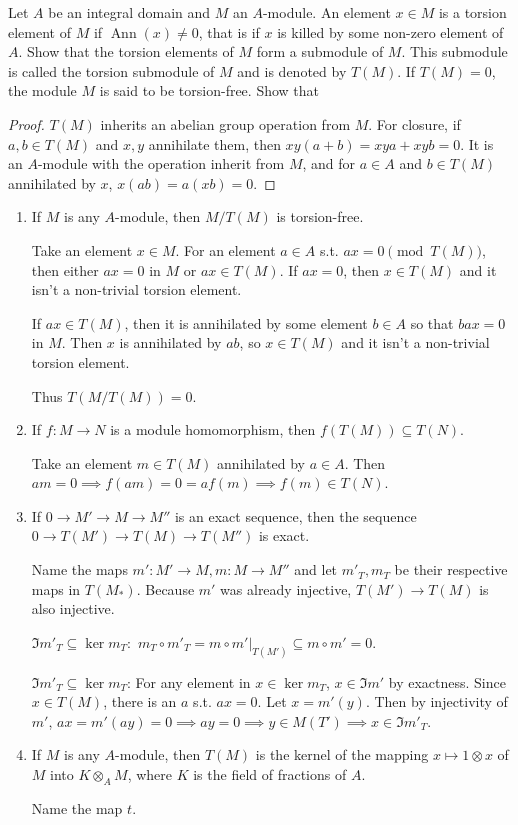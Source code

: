 \begin{questions}
\question Let $A$ be an integral domain and $M$ an $A$-module. An element $x \in M$ is a torsion element of $M$ if $\operatorname{Ann} (x) \ne 0$, that is if $x$ is killed by some non-zero element of $A$. Show that the torsion elements of $M$ form a submodule of $M$. This submodule is called the torsion submodule of $M$ and is denoted by $T(M)$. If $T(M) = 0$, the module $M$ is said to be torsion-free. Show that 
\begin{proof}
	$T(M) $ inherits an abelian group operation from $M $.
	For closure, if $a,b \in T(M) $ and $x,y $ annihilate them, then $xy(a+b) = xya + xyb = 0$.
	It is an $A $-module with the operation inherit from $M $, and for $a\in A $ and $b \in T(M) $ annihilated by $x $, $x(ab) = a(xb) = 0$.
\end{proof}
\begin{enumerate}
	\item If $M $ is any $A $-module, then $M / T(M) $ is torsion-free.
	\begin{solution}
		Take an element $x \in M $.
		For an element $a \in A$ s.t. $ax = 0\pmod {T(M)} $, then either $ax = 0 $ in $M $ or $ax \in T(M) $.
		If $ax = 0 $, then $x \in T(M) $ and it isn't a non-trivial torsion element.

		If $ax\in T(M) $, then it is annihilated by some element $b\in A $ so that $bax = 0 $ in $M $.
		Then $x $ is annihilated by $ab $, so $x\in T(M) $ and it isn't a non-trivial torsion element.

		Thus $T(M / T(M)) = 0 $.
	\end{solution}
	\item If $f: M\to N $ is a module homomorphism, then $f(T(M)) \subseteq T(N) $.
	\begin{solution}
		Take an element $m \in T(M) $ annihilated by $a\in A$.
		Then $am = 0 \implies f(am) = 0 = af(m) \implies f(m) \in T(N)$.
	\end{solution}
	\item If $0\to M' \to M \to M'' $ is an exact sequence, then the sequence $0 \to T(M') \to T(M) \to T(M'')$ is exact.
	\begin{solution}
		Name the maps $m': M'\to M, m: M\to M''$ and let $m'_T,m_T $ be their respective maps in $T(M_{\ast}) $.
		Because $m' $ was already injective, $T(M') \to T(M) $ is also injective.

		$\Im m'_T\subseteq \ker m_T: $ $m_T \circ m'_T = m\circ m'|_{T(M')} \subseteq m\circ m' = 0 $.

		$\Im m'_T \subseteq \ker m_T $: For any element in $x \in \ker m_T $, $x \in \Im m'$ by exactness.
		Since $x\in T(M) $, there is an $a $ s.t. $ax = 0 $.
		Let $x = m'(y) $.
		Then by injectivity of $m' $, $ax = m'(ay) = 0 \implies ay = 0 \implies y \in M(T') \implies x \in \Im m'_T $.
	\end{solution}
	\item If $M $ is any $A $-module, then $T(M) $ is the kernel of the mapping $x\mapsto 1 \otimes x $ of $M $ into $K \otimes _A M $, where $K $ is the field of fractions of $A $.
	\begin{solution}
		Name the map $t $.


\end{solution}
\end{enumerate}
\end{questions}
